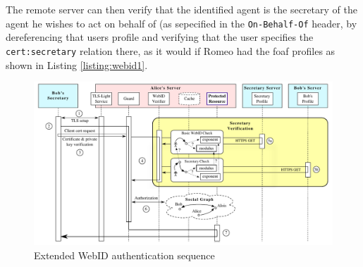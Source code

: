 \documentclass[a4paper]{llncs}
\begin{document}
%

The remote server can then verify that the identified agent is the secretary of the agent he wishes to act on behalf of (as sepecified in the \lstinline|On-Behalf-Of| header, by dereferencing that users profile and verifying that the user specifies the \lstinline|cert:secretary| relation there, as it would if Romeo had the foaf profiles as shown in Listing \ref{listing:webid1}.



\begin{figure}[htb]
  \centering
  \includegraphics[width=\textwidth]{AuthSequence}
  \caption{Extended WebID authentication sequence}
  \label{fig:AuthSequence}
\end{figure}

\end{document}
